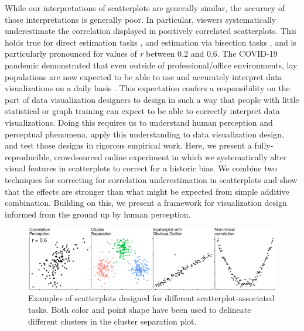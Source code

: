 \documentclass[manuscript, review, anonymous, screen]{acmart}
\begin{document}
While our interpretations of scatterplots are generally similar, the
accuracy of those interpretations is generally poor. In particular,
viewers systematically underestimate the correlation displayed in
positively correlated scatterplots. This holds true for direct
estimation tasks
\citep{strahan_1978, bobko_1979, cleveland_1982, lane_1985, lauer_1989, collyer_1990, meyer_1992},
and estimation via bisection tasks \citep{rensink_2017}, and is
particularly pronounced for values of \emph{r} between 0.2 and 0.6. The
COVID-19 pandemic demonstrated that even outside of professional/office
environments, lay populations are now expected to be able to use and
accurately interpret data visualizations on a daily basis
\citep{bbc_2022}. This expectation confers a responsibility on the part
of data visualization designers to design in such a way that people with
little statistical or graph training can expect to be able to correctly
interpret data visualizations. Doing this requires us to understand
human perception and perceptual phenomena, apply this understanding to
data visualization design, and test those designs in rigorous empirical
work. Here, we present a fully-reproducible, crowdsourced online
experiment in which we systematically alter visual features in
scatterplots to correct for a historic bias. We combine two techniques
for correcting for correlation underestimation in scatterplots and show
that the effects are stronger than what might be expected from simple
additive combination. Building on this, we present a framework for
visualization design informed from the ground up by human perception.

\begin{figure}

{\centering \includegraphics[width=1\textwidth,height=\textheight]{size_and_contrast_files/figure-pdf/fig-tasks-1.pdf}

}

\caption{\label{fig-tasks}Examples of scatterplots designed for
different scatterplot-associated tasks. Both color and point shape have
been used to delineate different clusters in the cluster separation
plot.}

\end{figure}
\end{document}
